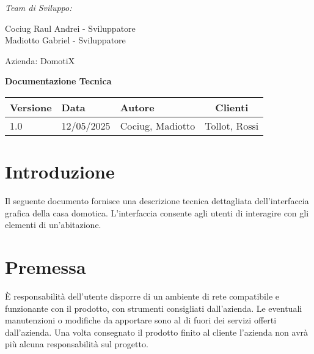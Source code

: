 \documentclass[a4paper,12pt]{article}
\begin{document}
\begin{titlepage}
    \begin{minipage}[t]{0.4\textwidth}
    \raggedright
    {\large\itshape Team di Sviluppo:\par}
    \vspace{0.2cm}
    
    Cociug Raul Andrei - Sviluppatore \\
    Madiotto Gabriel - Sviluppatore
    \end{minipage}
    \hfill
    \begin{minipage}[t]{0.4\textwidth}
    \raggedleft
    {\Large Azienda: DomotiX\par}
    \end{minipage}
    
    \centering
    \vspace*{5cm}
    
    {\Huge\bfseries Documentazione Tecnica\par}
    
    \vfill
    
    \begin{table}[h]
    \centering
    \begin{tabular}{@{}lllc@{}}
    \toprule
    Versione & Data & Autore & Clienti \\  
    \midrule
    1.0 & 12/05/2025 & Cociug, Madiotto & Tollot, Rossi \\
    \bottomrule
    \end{tabular}
    \end{table}
    
    \thispagestyle{empty}
\end{titlepage}

\tableofcontents
\newpage

\section{Introduzione}

Il seguente documento fornisce una descrizione tecnica dettagliata dell'interfaccia grafica della casa domotica. L’interfaccia consente agli utenti di interagire con gli elementi di un’abitazione.

\section{Premessa}

È responsabilità dell’utente disporre di un ambiente di rete compatibile e funzionante con il prodotto, con strumenti consigliati dall'azienda. Le eventuali manutenzioni o modifiche da apportare sono al di fuori dei servizi offerti dall'azienda. Una volta consegnato il prodotto finito al cliente l'azienda non avrà più alcuna responsabilità sul progetto.
\end{document}

